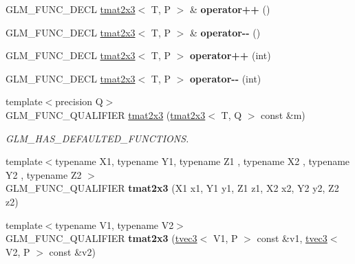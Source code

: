 \begin{DoxyCompactItemize}
G\+L\+M\+\_\+\+F\+U\+N\+C\+\_\+\+D\+E\+CL \hyperlink{structglm_1_1tmat2x3}{tmat2x3}$<$ T, P $>$ \& {\bfseries operator++} ()
\item 
\mbox{\label{structglm_1_1tmat2x3_a5d7a0f908e4ac53b0caad27168cf9d12}} 
G\+L\+M\+\_\+\+F\+U\+N\+C\+\_\+\+D\+E\+CL \hyperlink{structglm_1_1tmat2x3}{tmat2x3}$<$ T, P $>$ \& {\bfseries operator-\/-\/} ()
\item 
\mbox{\label{structglm_1_1tmat2x3_aadd0bc2be76fb70f799aa6988aa2f5a6}} 
G\+L\+M\+\_\+\+F\+U\+N\+C\+\_\+\+D\+E\+CL \hyperlink{structglm_1_1tmat2x3}{tmat2x3}$<$ T, P $>$ {\bfseries operator++} (int)
\item 
\mbox{\label{structglm_1_1tmat2x3_a1bc6bd0e64ef98585c680a9365614f7c}} 
G\+L\+M\+\_\+\+F\+U\+N\+C\+\_\+\+D\+E\+CL \hyperlink{structglm_1_1tmat2x3}{tmat2x3}$<$ T, P $>$ {\bfseries operator-\/-\/} (int)
\item 
\mbox{\label{structglm_1_1tmat2x3_afb43a1d554a16750b2f42ebe95579a86}} 
{\footnotesize template$<$precision Q$>$ }\\G\+L\+M\+\_\+\+F\+U\+N\+C\+\_\+\+Q\+U\+A\+L\+I\+F\+I\+ER \hyperlink{structglm_1_1tmat2x3_afb43a1d554a16750b2f42ebe95579a86}{tmat2x3} (\hyperlink{structglm_1_1tmat2x3}{tmat2x3}$<$ T, Q $>$ const \&m)
\begin{DoxyCompactList}\small\item\em G\+L\+M\+\_\+\+H\+A\+S\+\_\+\+D\+E\+F\+A\+U\+L\+T\+E\+D\+\_\+\+F\+U\+N\+C\+T\+I\+O\+NS. \end{DoxyCompactList}\item 
\mbox{\label{structglm_1_1tmat2x3_aafa68618483fa56dce44ee2a8bcb91c0}} 
{\footnotesize template$<$typename X1, typename Y1, typename Z1 , typename X2 , typename Y2 , typename Z2 $>$ }\\G\+L\+M\+\_\+\+F\+U\+N\+C\+\_\+\+Q\+U\+A\+L\+I\+F\+I\+ER {\bfseries tmat2x3} (X1 x1, Y1 y1, Z1 z1, X2 x2, Y2 y2, Z2 z2)
\item 
\mbox{\label{structglm_1_1tmat2x3_a4cb1b9991bfa8f25e56a637081d4ee67}} 
{\footnotesize template$<$typename V1, typename V2$>$ }\\G\+L\+M\+\_\+\+F\+U\+N\+C\+\_\+\+Q\+U\+A\+L\+I\+F\+I\+ER {\bfseries tmat2x3} (\hyperlink{structglm_1_1tvec3}{tvec3}$<$ V1, P $>$ const \&v1, \hyperlink{structglm_1_1tvec3}{tvec3}$<$ V2, P $>$ const \&v2)

\end{DoxyCompactItemize}
